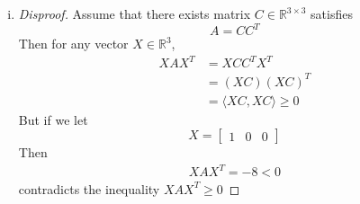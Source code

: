 \documentclass[12pt]{article}
\newcommand{\R}{\mathbb{R}}
\begin{document}
\begin{enumerate}[1)]
\begin {enumerate}[(a)]
\begin{enumerate}[(i)]
\begin{proof}
$$\begin{matrix}
                            cos\theta & sin\theta\\
                            -sin\theta & cos\theta
                        \end{matrix}
                    \right]
                   = \left[
                        \begin{matrix}
                            cos(-\theta) & -sin(-\theta)\\
                            sin(-\theta) & cos(-\theta)
                        \end{matrix}
                    \right]$$
               When $k$ is odd,
               $$ A = \left[
                        \begin{matrix}
                            a & b \\
                            c & d
                        \end{matrix}
                    \right]
                    =  \left[
                        \begin{matrix}
                            cos\theta & sin\theta \\
                            cos\theta' & sin\theta'
                        \end{matrix}
                    \right]
                   = \left[
                        \begin{matrix}
                            cos\theta & sin\theta\\
                            sin\theta & -cos\theta
                        \end{matrix}
                    \right]$$
               	Therefore the statement is \emph{True}.
            \end{proof}
        \item
        	\begin{proof}[Disproof]
            	Assume that there exists matrix $C \in \R^{3 \times 3}$ satisfies
                $$A = CC^{T}$$
                Then for any vector $ X \in \R^{3}$,
                \begin{align*}
                	XAX^{T} & = XCC^{T}X^{T} \\
                    		& = (XC)(XC)^T \\
                            & = \langle XC, XC \rangle \geq 0
                \end{align*}
                But if we let
                $$X = \left[
                        \begin{matrix}
                            1 & 0 & 0
                        \end{matrix}
                    \right]$$
                Then
                \begin{align*}
                	XAX^T = -8 < 0
                \end{align*}
                contradicts the inequality $XAX^{T} \geq 0$
                

\end{proof}
\end{enumerate}
\end{enumerate}
\end{enumerate}
\end{document}
